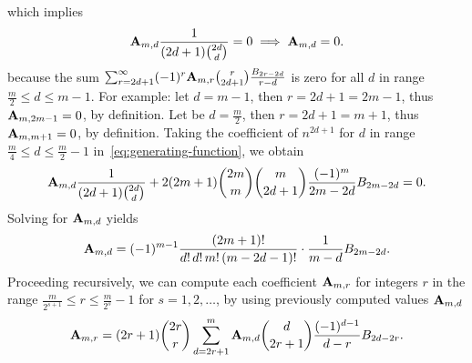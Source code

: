 which implies
\begin{align*}
    {\mathbf{A}} \sb{m,d} \frac{1}{(2d+1) \binom{2d}{d}} = 0 \implies {\mathbf{A}} \sb{m,d} = 0.
\end{align*}
because the sum $\sum_{r=2d+1}^{\infty} (-1)^r {\mathbf{A}} \sb{m,r} \binom{r}{2d+1} \frac{{B}\sb{2r-2d} }{r-d}$ is zero
for all $d$ in range $\frac{m}{2} \leq d \leq m-1$.
For example: let $d=m-1$, then $r= 2d+1 = 2m-1$, thus ${\mathbf{A}} \sb{m,2m-1}=0$, by definition.
Let be $d=\frac{m}{2}$, then $r=2d+1 = m+1$, thus ${\mathbf{A}} \sb{m,m+1}=0$, by definition.
Taking the coefficient of $n^{2d+1}$ for $d$ in range $\frac{m}{4} \leq d \leq \frac{m}{2}-1$ in~\eqref{eq:generating-function}, we obtain
\begin{align*}
    {\mathbf{A}} \sb{m,d} \frac{1}{(2d+1) \binom{2d}{d}}
    + 2 (2m+1) \binom{2m}{m} \binom{m}{2d+1} \frac{(-1)^m}{2m - 2d} {B}\sb{2m - 2d} = 0.
\end{align*}
Solving for ${\mathbf{A}} \sb{m,d}$ yields
\begin{equation*}
    {\mathbf{A}} \sb{m,d}
    = (-1)^{m-1} \frac{(2m+1)!}{d! \, d! \, m! \, (m - 2d - 1)!} \cdot \frac{1}{m - d} {B}\sb{2m - 2d}.
\end{equation*}
Proceeding recursively, we can compute each coefficient ${\mathbf{A}} \sb{m,r}$ for integers $r$ in the range
$\frac{m}{2^{s+1}} \leq r \leq \frac{m}{2^s}-1$ for $s = 1, 2, \ldots$,
by using previously computed values ${\mathbf{A}} \sb{m,d}$
\begin{equation*}
    {\mathbf{A}} \sb{m,r} =
    (2r+1) \binom{2r}{r} \sum_{d = 2r+1}^{m}
    {\mathbf{A}} \sb{m,d} \binom{d}{2r+1} \frac{(-1)^{d-1}}{d - r} {B}\sb{2d - 2r}.
\end{equation*}
